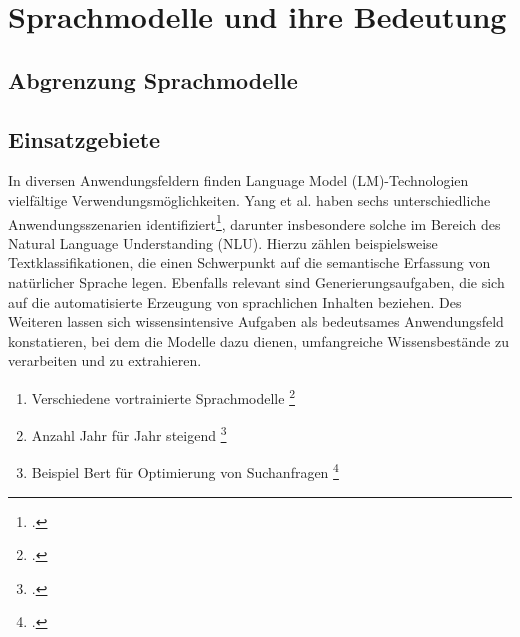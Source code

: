 \section{Sprachmodelle und ihre Bedeutung}
\subsection{Abgrenzung Sprachmodelle}
\subsection{Einsatzgebiete}
In diversen Anwendungsfeldern finden Language Model (LM)-Technologien vielfältige Verwendungsmöglichkeiten. Yang et al. haben sechs unterschiedliche Anwendungsszenarien identifiziert\footcite[Vgl.][S. 6 ff.]{yang2023harnessing}, darunter insbesondere solche im Bereich des Natural Language Understanding (NLU). Hierzu zählen beispielsweise Textklassifikationen, die einen Schwerpunkt auf die semantische Erfassung von natürlicher Sprache legen. Ebenfalls relevant sind Generierungsaufgaben, die sich auf die automatisierte Erzeugung von sprachlichen Inhalten beziehen. Des Weiteren lassen sich wissensintensive Aufgaben als bedeutsames Anwendungsfeld konstatieren, bei dem die Modelle dazu dienen, umfangreiche Wissensbestände zu verarbeiten und zu extrahieren.
\begin{enumerate}
    \item Verschiedene vortrainierte Sprachmodelle \footcite{zhou2023comprehensive}
    \item Anzahl Jahr für Jahr steigend \footcite{naveed2023comprehensive}
    \item Beispiel Bert für Optimierung von Suchanfragen \footcite{devlin2018bert}
\end{enumerate}
